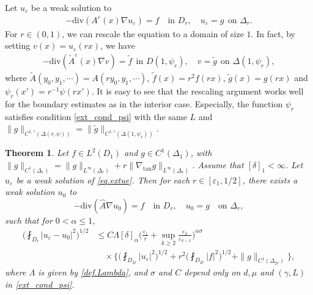 \documentclass[reqno,12pt]{amsart} %
\newtheorem{theorem}{Theorem}[section]
\theoremstyle{definition}
\theoremstyle{remark}
\numberwithin{equation}{section}
\newcommand{\e}{\varepsilon}
\begin{document}
Let $u_\varepsilon$ be a weak solution to
\begin{align}\label{eq.extue}
  -\mathrm{div}(A^\varepsilon(x)\nabla u_\varepsilon)=f \quad \text{in }D_r,\quad u_\varepsilon=g\ \ \text{on }\Delta_r. 
\end{align}
For $r\in (0,1)$, we can rescale the equation to a domain of size $1$. In fact, by setting $v(x)=u_\varepsilon(rx)$, we have
\begin{align*}
  -\mathrm{div}(\widetilde{A}^\varepsilon(x)\nabla v)=\widetilde{f}\ \ \text{in }D(1, \psi_r),\quad v=\widetilde{g}\ \ \text{on }\Delta(1, \psi_r),
\end{align*}
where $\widetilde{A}(y_0, y_1, \cdots)=A(ry_0, y_1, \cdots)$, $\widetilde{f}(x)=r^2f(rx)$, $\widetilde{g}(x)=g(rx)$ and $\psi_r(x')=r^{-1}\psi(rx')$. It is easy to see that the rescaling argument works well for the boundary estimates as in the interior case. Especially, the function $\psi_r$ satisfies condition \eqref{ext_cond_psi} with the same $L$ and $\|g\|_{C^{1, \gamma}(\Delta(r, \psi))}=\|\widetilde{g}\|_{C^{1, \gamma}(\Delta(1, \psi_r))}$. 

\begin{theorem}\label{ext_lem_approx}
    Let $f\in L^2(D_1)$ and $g\in C^1(\Delta_1)$, with $\|g\|_{C^1(\Delta_r)}=\|g\|_{L^\infty(\Delta_r)}+r\|\nabla_{\mathrm{tan}}g\|_{L^\infty(\Delta_r)}$. Assume that $[\delta]_1<\infty$. Let $u_\e$ be a weak solution of \eqref{eq.extue}. Then for each $r\in[\varepsilon_1, 1/2]$, there exists a weak solution $u_0$ to 
    \begin{equation}\label{eq.extu0}
        -\mathrm{div}(\widehat{A}\nabla u_0)=f \quad \text{in } D_r, \quad u_0 = g \quad \text{on } \Delta_r,
    \end{equation}
    such that for $0<\alpha\leq 1$,
    \begin{align*}
        \bigg(\fint_{D_r}|u_\varepsilon-u_0|^2\bigg)^{1/2}& \leq C\Lambda [\delta]_\alpha\bigg(\frac{\varepsilon_1}{r}+\sup_{k\geq 2}\frac{\e_k}{\e_{k-1}}\bigg)^{\alpha\sigma} \\
        &\quad\times\bigg\{\bigg(\fint_{D_{2r}}|u_\varepsilon|^2\bigg)^{1/2}+r^2\bigg(\fint_{D_{2r}}|f|^2\bigg)^{1/2}+\|g\|_{C^1(\Delta_{2r})}\bigg\},
    \end{align*}
    where $\Lambda $ is given by \eqref{def.Lambda}, and $\sigma$ and $C$ depend only on $d, \mu$ and $(\gamma, L)$ in \eqref{ext_cond_psi}.
\end{theorem}
\end{document}
